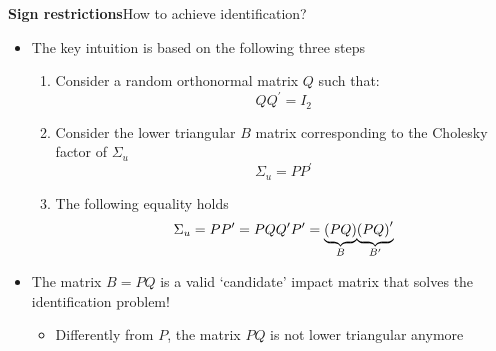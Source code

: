 \begin{frame}
{\textbf{Sign restrictions}}{How to achieve identification?}

\begin{itemize}
\item The key intuition is based on the following three steps\smallskip

\begin{enumerate}
\item Consider a random orthonormal matrix $Q$ such that:%
\begin{equation*}
QQ^{\prime }=I_{2}
\end{equation*}%
\pause\vspace{-0.15cm}

\item Consider the lower triangular $B$ matrix corresponding to the Cholesky
factor of $\Sigma _{u}$ 
\begin{equation*}
\Sigma _{u}=PP^{\prime }
\end{equation*}%
\pause\vspace{-0.15cm}

\item The following equality holds%
\begin{equation*}
\Sigma _{u}=PP^{\prime }=PQQ^{\prime }P^{\prime }=\underset{B}{\underbrace{%
\left( PQ\right) }}\underset{B^{\prime }}{\underbrace{\left( PQ\right)
^{\prime }}}
\end{equation*}%
\pause
\end{enumerate}

\item The matrix $B=PQ$ is a valid `candidate' impact matrix that solves the
identification problem!\smallskip

\begin{itemize}
\item Differently from $P$, the matrix $PQ$ is not lower triangular anymore
\end{itemize}
\end{itemize}
\end{frame}


